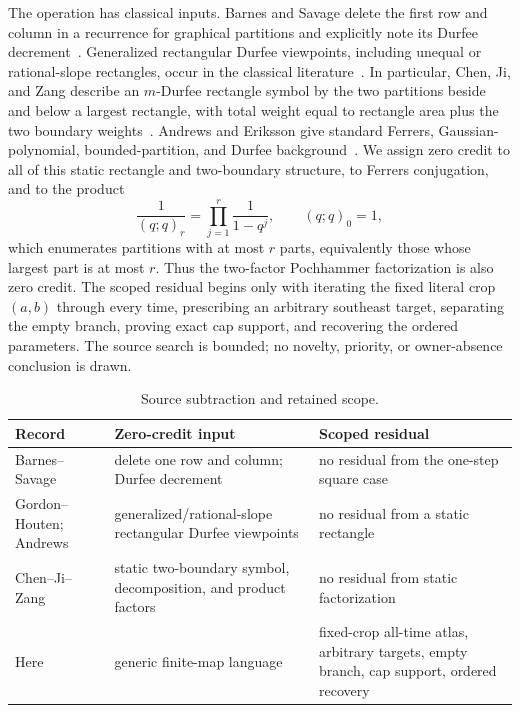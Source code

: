 \documentclass[a4paper,10pt]{amsart}
\theoremstyle{remark}
\newcommand{\qfac}[1]{(q;q)_{#1}}
\begin{document}
The operation has classical inputs.  Barnes and Savage delete the first row
and column in a recurrence for graphical partitions and explicitly note its
Durfee decrement~\cite{BarnesSavage1995}.  Generalized rectangular Durfee
viewpoints, including unequal or rational-slope rectangles, occur in the
classical literature~\cite{GordonHouten1968,Andrews1971}.  In particular,
Chen, Ji, and Zang describe an $m$-Durfee rectangle symbol by the two
partitions beside and below a largest rectangle, with total weight equal to
rectangle area plus the two boundary weights~\cite[Sec.~3]{ChenJiZang2015}.
Andrews and Eriksson give standard Ferrers, Gaussian-polynomial,
bounded-partition, and Durfee background~\cite{AndrewsEriksson2004}.  We
assign zero credit to all of this static rectangle and two-boundary
structure, to Ferrers conjugation, and to the product
\begin{equation}\label{eq:pochhammer}
 \frac1{\qfac r}=\prod_{j=1}^{r}\frac1{1-q^j},\qquad \qfac0=1,
\end{equation}
which enumerates partitions with at most $r$ parts, equivalently those whose
largest part is at most $r$.  Thus the two-factor Pochhammer factorization is
also zero credit.  The scoped residual begins only with iterating the fixed
literal crop $(a,b)$ through every time, prescribing an arbitrary southeast
target, separating the empty branch, proving exact cap support, and recovering
the ordered parameters.  The source search is bounded; no novelty, priority,
or owner-absence conclusion is drawn.

\begin{table}[ht]
\centering
\small
\caption{Source subtraction and retained scope.}
\label{tab:subtraction}
\begin{tabular}{@{}>{\raggedright\arraybackslash}p{}
                    >{\raggedright\arraybackslash}p{}
                    >{\raggedright\arraybackslash}p{}@{}}
\toprule
Record & Zero-credit input & Scoped residual \\
\midrule
Barnes--Savage~\cite{BarnesSavage1995}
& delete one row and column; Durfee decrement
& no residual from the one-step square case \\
Gordon--Houten; Andrews~\cite{GordonHouten1968,Andrews1971}
& generalized/rational-slope rectangular Durfee viewpoints
& no residual from a static rectangle \\
Chen--Ji--Zang~\cite{ChenJiZang2015}
& static two-boundary symbol, decomposition, and product factors
& no residual from static factorization \\
Here
& generic finite-map language
& fixed-crop all-time atlas, arbitrary targets, empty branch, cap support,
ordered recovery \\
\bottomrule
\end{tabular}
\end{table}
\end{document}
